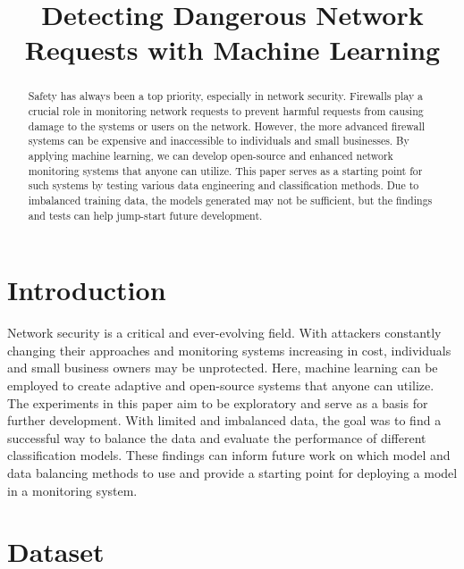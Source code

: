 \documentclass[conference]{IEEEtran}
\begin{document}
\title{Detecting Dangerous Network Requests with Machine Learning}

\author{
}

\maketitle

\begin{abstract}
Safety has always been a top priority, especially in network security. Firewalls play a crucial role in monitoring network requests to prevent harmful requests from causing damage to the systems or users on the network. However, the more advanced firewall systems can be expensive and inaccessible to individuals and small businesses. By applying machine learning, we can develop open-source and enhanced network monitoring systems that anyone can utilize. This paper serves as a starting point for such systems by testing various data engineering and classification methods. Due to imbalanced training data, the models generated may not be sufficient, but the findings and tests can help jump-start future development.
\end{abstract}

\section{Introduction}
Network security is a critical and ever-evolving field. With attackers constantly changing their approaches and monitoring systems increasing in cost, individuals and small business owners may be unprotected. Here, machine learning can be employed to create adaptive and open-source systems that anyone can utilize. The experiments in this paper aim to be exploratory and serve as a basis for further development. With limited and imbalanced data, the goal was to find a successful way to balance the data and evaluate the performance of different classification models. These findings can inform future work on which model and data balancing methods to use and provide a starting point for deploying a model in a monitoring system.

\section{Dataset}
\end{document}
